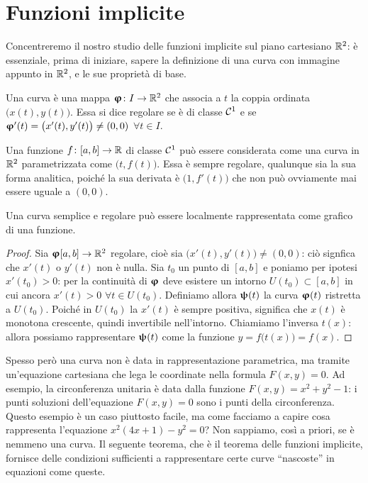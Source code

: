 \chapter{Funzioni implicite}
Concentreremo il nostro studio delle funzioni implicite sul piano cartesiano $\mathbb{R}^2$: è essenziale, prima di iniziare, sapere la definizione di una curva con immagine appunto in $\mathbb{R}^2$, e le sue proprietà di base.
\begin{definizione}
	Una curva è una mappa $\bm{\upvarphi}\colon I\to\mathbb{R}^2$ che associa a $t$ la coppia ordinata $\big(x(t),y(t)\big)$.
	Essa si dice regolare se è di classe $\mathcal{C}^{{1}}$ e se $\bm{\upvarphi}'(t)=\big(x'(t),y'(t)\big)\neq(0,0)$ $\forall t\in I$.
\end{definizione}
Una funzione $f\colon[a,b]\to\mathbb{R}$ di classe $\mathcal{C}^{{1}}$ può essere considerata come una curva in $\mathbb{R}^2$ parametrizzata come $\big(t,f(t)\big)$.
Essa è sempre regolare, qualunque sia la sua forma analitica, poiché la sua derivata è $\big(1,f'(t)\big)$ che non può ovviamente mai essere uguale a $(0,0)$.
\begin{osservazione}
	Una curva semplice e regolare può essere localmente rappresentata come grafico di una funzione.
\end{osservazione}
\begin{proof}
	Sia $\bm{\upvarphi}[a,b]\to\mathbb{R}^2$ regolare, cioè sia $\big(x'(t),y'(t)\big)\neq(0,0)$: ciò signfica che $x'(t)$ o $y'(t)$ non è nulla.
	Sia $t_0$ un punto di $[a,b]$ e poniamo per ipotesi $x'(t_0)>0$: per la continuità di $\bm{\upvarphi}$ deve esistere un intorno $U(t_0)\subset[a,b]$ in cui ancora $x'(t)>0$ $\forall t\in U(t_0)$.
	Definiamo allora $\bm{\uppsi}(t)$ la curva $\bm{\upvarphi}(t)$ ristretta a $U(t_0)$.
	Poiché in $U(t_0)$ la $x'(t)$ è sempre positiva, significa che $x(t)$ è monotona crescente, quindi invertibile nell'intorno.
	Chiamiamo l'inversa $t(x)$: allora possiamo rappresentare $\bm{\uppsi}(t)$ come la funzione $y=f\big(t(x)\big)=f(x)$.
\end{proof}
Spesso però una curva non è data in rappresentazione parametrica, ma tramite un'equazione cartesiana che lega le coordinate nella formula $F(x,y)=0$.
Ad esempio, la circonferenza unitaria è data dalla funzione $F(x,y)=x^2+y^2-1$: i punti soluzioni dell'equazione $F(x,y)=0$ sono i punti della circonferenza.
Questo esempio è un caso piuttosto facile, ma come facciamo a capire cosa rappresenta l'equazione $x^2(4x+1)-y^2=0$?
Non sappiamo, così a priori, se è nemmeno una curva.
Il seguente teorema, che è il teorema delle funzioni implicite, fornisce delle condizioni sufficienti a rappresentare certe curve ``nascoste'' in equazioni come queste.
